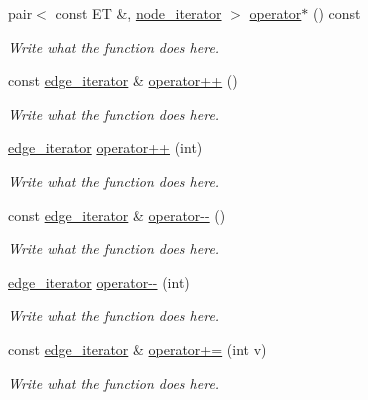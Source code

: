 \begin{DoxyCompactItemize}
\item 
pair$<$ const E\+T \&, \hyperlink{classgraph_1_1node__iterator}{node\+\_\+iterator} $>$ \hyperlink{classgraph_1_1edge__iterator_ac36e53fb781544acaa92112ad71c59d5}{operator$\ast$} () const 
\begin{DoxyCompactList}\small\item\em Write what the function does here. \end{DoxyCompactList}\item 
const \hyperlink{classgraph_1_1edge__iterator}{edge\+\_\+iterator} \& \hyperlink{classgraph_1_1edge__iterator_ab8e3c8768c990af31d9fbb0de7e6e61f}{operator++} ()
\begin{DoxyCompactList}\small\item\em Write what the function does here. \end{DoxyCompactList}\item 
\hyperlink{classgraph_1_1edge__iterator}{edge\+\_\+iterator} \hyperlink{classgraph_1_1edge__iterator_a1b23686e252d3c458daa9ef212681d19}{operator++} (int)
\begin{DoxyCompactList}\small\item\em Write what the function does here. \end{DoxyCompactList}\item 
const \hyperlink{classgraph_1_1edge__iterator}{edge\+\_\+iterator} \& \hyperlink{classgraph_1_1edge__iterator_accb7545e2bc008e9a3e78c6b82a0274c}{operator-\/-\/} ()
\begin{DoxyCompactList}\small\item\em Write what the function does here. \end{DoxyCompactList}\item 
\hyperlink{classgraph_1_1edge__iterator}{edge\+\_\+iterator} \hyperlink{classgraph_1_1edge__iterator_af8d50792e43cd93274ddc5866fe941d7}{operator-\/-\/} (int)
\begin{DoxyCompactList}\small\item\em Write what the function does here. \end{DoxyCompactList}\item 
const \hyperlink{classgraph_1_1edge__iterator}{edge\+\_\+iterator} \& \hyperlink{classgraph_1_1edge__iterator_a5fab360b45d461a96a1d33d4537bd0fd}{operator+=} (int v)
\begin{DoxyCompactList}\small\item\em Write what the function does here. \end{DoxyCompactList}\item 

\end{DoxyCompactItemize}
